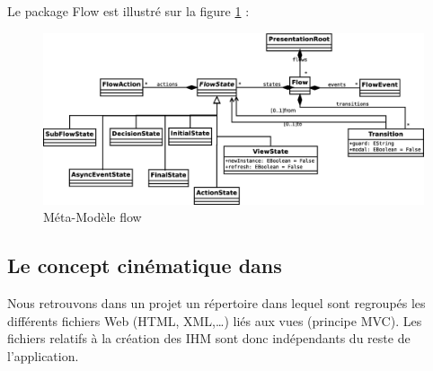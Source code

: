 \begin{itemize}
Le package Flow est illustré sur la figure \ref{fig:flow} :

\begin{figure}[h]
  \centering
  \includegraphics[scale=.3]{img/flow.eps}
  \caption{Méta-Modèle flow}
  \label{fig:flow}
\end{figure}

\end{itemize}


\subsection{Le concept cinématique dans \kwplay{}}
Nous retrouvons dans un projet \kwplay{} un répertoire dans lequel sont regroupés les différents fichiers Web (HTML, XML,\dots) liés aux vues (principe MVC). Les fichiers relatifs à la création des \textsc{IHM} sont donc indépendants du reste de l'application.   

